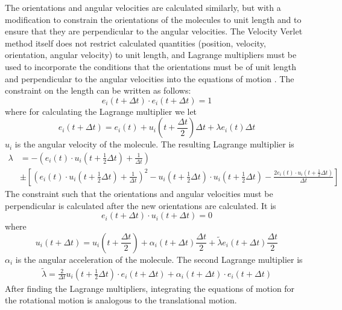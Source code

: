 \documentclass[preprint, aps]{revtex4-1}
\begin{document}
The orientations and angular velocities are calculated similarly, but with a
modification to constrain the orientations of the molecules to unit length and
to ensure that they are perpendicular to the angular velocities. The Velocity 
Verlet method itself does not restrict calculated quantities (position, 
velocity, orientation, angular velocity) to unit length, and Lagrange 
multipliers must be used to incorporate the conditions that the orientations
must be of unit length and perpendicular to the angular velocities into the 
equations of motion \cite{allen87}. The constraint on the length can be written 
as follows:
	\begin{equation} \label{unit-length}
		e_i(t+\Delta t)  \cdot e_i(t+\Delta t) = 1
	\end{equation}
where for calculating the Lagrange multiplier we let
	\begin{equation} \label{vv-e}
		e_i(t+\Delta t) 
		= e_i(t) 
		+ u_i(t + \frac{\Delta t}{2})\Delta t 
		+ \lambda e_i(t) \Delta t
	\end{equation}
$u_i$ is the angular velocity of the molecule. The resulting Lagrange multiplier 
is 
	\begin{equation} \label{lagrange-1}
		\begin{align}
			\lambda 
			& = -\left(e_i(t) 
				\cdot u_i(t+\frac{1}{2}\Delta t)+\frac{1}{\Delta t} 
			\right)\\
			& \pm \left[ 
				\left( e_i(t) \cdot u_i(t+\frac{1}{2}\Delta t)
				+ \frac{1}{\Delta t}
				\right)^2 
				- u_i(t+\frac{1}{2}\Delta t) 
				\cdot u_i(t+\frac{1}{2}\Delta t)
				- \frac{2 e_i(t) \cdot u_i(t+\frac{1}{2}\Delta t)}
				{\Delta t}
			\right]
		\end{align}
	\end{equation}
The constraint such that the orientations and angular velocities must be
perpendicular is calculated after the new orientations are calculated. It is
	\begin{equation} \label{eu-perp}
		e_i(t+\Delta t)  \cdot u_i(t+\Delta t)  = 0
	\end{equation}
where 
	\begin{equation} \label{vv-u}
		u_i(t+\Delta t) = u_i(t+\frac{\Delta t}{2}) 
		+ \alpha_i(t+\Delta t)\frac{\Delta t}{2} 
		+ \tilde{\lambda} e_i(t+\Delta t)\frac{\Delta t}{2}
	\end{equation}
$\alpha_i$ is the angular acceleration of the molecule. The second Lagrange
multiplier is
	\begin{equation} \label{lagrange-2}
		\begin{align}
			\tilde{\lambda} 
			= \frac{2}{\Delta t} u_i(t + \frac{1}{2}\Delta t) 
			\cdot e_i(t+\Delta t) 
			+ \alpha_i(t + \Delta t) \cdot e_i (t + \Delta t)
		\end{align}
	\end{equation}
After finding the Lagrange multipliers, integrating the equations of motion for
the rotational motion is analogous to the translational motion.
\end{document}
